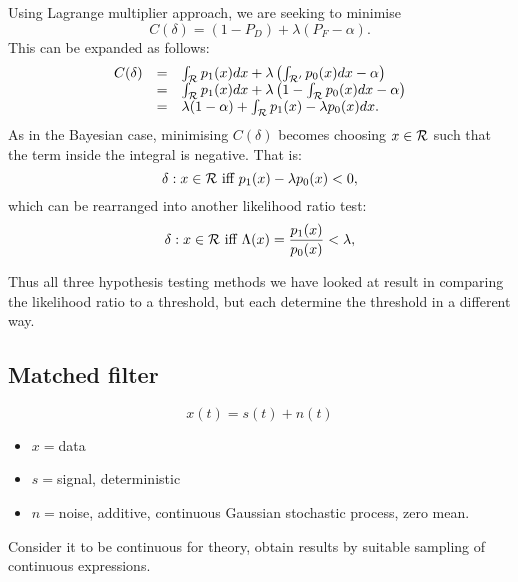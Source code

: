 Using Lagrange multiplier approach, we are seeking to minimise 
\begin{equation}
C(\delta) = (1-P_D)+\lambda (P_F - \alpha).
\end{equation}
This can be expanded as follows:
\begin{equation}
\begin{array}{rcl}
C(\delta) &=& \int_{\mathcal{R}} p_1 (x) dx + \lambda \left(\int_{\mathcal{R}'} p_0(x)dx-\alpha \right) \\
&=& \int_{\mathcal{R}} p_1 (x) dx + \lambda \left(1- \int_{\mathcal{R}}  p_0(x)dx
 -\alpha \right) \\
&=& \lambda (1-\alpha)+\int_{\mathcal{R}} p_1 (x) - \lambda p_0(x)dx.
\end{array}
\end{equation}
As in the Bayesian case, minimising $C(\delta)$ becomes choosing $x \in \mathcal{R}$ such that the term inside the integral is negative. That is:
\begin{equation}
\delta: x \in \mathcal{R} \mbox{ iff } p_1 (x) - \lambda p_0(x) < 0,
\end{equation}
which can be rearranged into another likelihood ratio test:
\begin{equation}
\delta: x \in \mathcal{R} \mbox{ iff } \Lambda(x) = \frac{p_1 (x)}{ p_0(x)} < \lambda,
\end{equation}

Thus all three hypothesis testing methods we have looked at result in comparing the likelihood ratio to a threshold, but each determine the threshold in a different way.

\subsection{Matched filter}
\begin{equation}
x(t)=s(t)+n(t)
\end{equation}
\begin{itemize}
\item $x=$data
\item $s=$signal, deterministic
\item $n=$noise, additive, continuous Gaussian stochastic process, zero mean. 
\end{itemize}
Consider it to be continuous for theory, obtain results by suitable sampling of continuous expressions.


